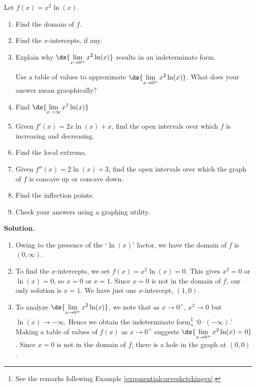 \documentclass{ximera}
\begin{document}
\begin{example}\label{logcurvesketchex} Let  $f(x) = x^2 \ln(x)$.

\begin{enumerate}

\item  Find the domain of $f$.

\item  Find the $x$-intercepts, if any.

\item Explain why $\ds{ \lim_{x \rightarrow 0^{+}} x^2 \ln(x)}$ results in an indeterminate form.

Use a table of values  to approximate $\ds{ \lim_{x \rightarrow 0^{+}} x^2 \ln(x)}$.  What does your answer mean graophically? 

\item  Find  $\ds{ \lim_{x \rightarrow \infty} x^2 \ln(x)}$ 

\item  Given $f'(x) = 2x \ln(x) + x$, find the open intervals over which $f$ is increasing and decreasing.

\item  Find the local extrema.

\item  Given $f''(x) = 2 \ln(x) + 3$, find the open intervals over which the graph of $f$ is concave up or concave down.

\item Find the inflection points.

\item  Check your answers using a graphing utility.

\end{enumerate} 

{\bf Solution.}  

\begin{enumerate}

\item  Owing to the presence of the `$\ln(x)$' factor, we have the domain of $f$ is $(0, \infty)$.

\item  To find the $x$-intercepts, we set $f(x) = x^2 \ln(x) = 0$.  This gives $x^2 = 0$ or $\ln(x) = 0$, so $x = 0$ or $x = 1$.  Since $x=0$ is not in the domain of $f$, our only solution is $x = 1$. We have just one $x$-intercept, $(1,0)$.

\item   To analyze $\ds{ \lim_{x \rightarrow 0^{+}} x^2 \ln(x)}$, we note that as $x \rightarrow 0^{+}$, $x^2 \rightarrow 0$ but $\ln(x) \rightarrow -\infty$.  Hence we obtain the indeterminate form\footnote{See the remarks following Example \ref{exponentialcurvesketchingex}.} `$0 \cdot (- \infty)$.'   Making a table of values of $f(x)$ as $x \rightarrow 0^{+}$ suggests  $\ds{ \lim_{x \rightarrow 0^{+}} x^2 \ln(x) = 0}$.  Since $x = 0$ is not in the domain of $f$, there is a hole in the graph at $(0,0)$.


\end{enumerate}
\end{example}
\end{document}
